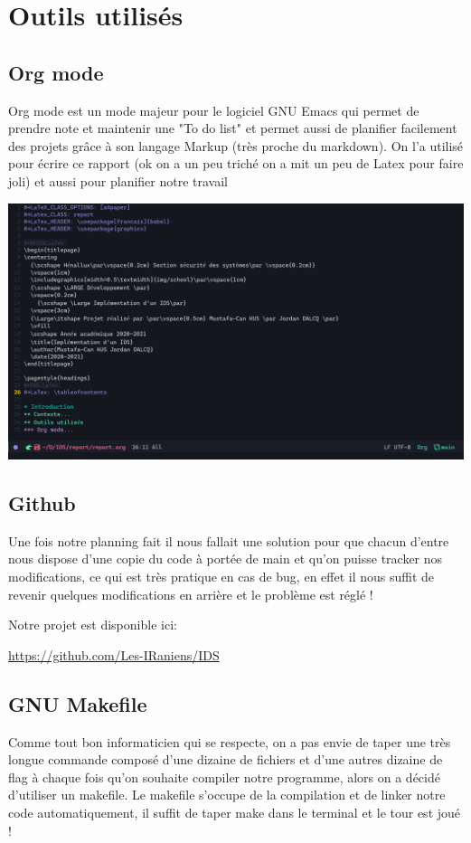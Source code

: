 \documentclass[a4paper]{report}
\begin{document}
\chapter{Outils utilisés}
\label{sec:org9905d3c}
\section{Org mode}
\label{sec:orgf4c7e20}
Org mode est un mode majeur pour le logiciel GNU Emacs qui permet de prendre note et maintenir une "To do list" et permet aussi de planifier facilement des projets
grâce à son langage Markup (très proche du markdown). On l'a utilisé pour écrire ce rapport (ok on a un peu triché on a mit un peu de Latex pour faire joli) et aussi
pour planifier notre travail 

\begin{center}
\includegraphics[width=.9\linewidth]{./img/org.png}
\end{center}
\section{Github}
\label{sec:org895be39}
Une fois notre planning fait il nous fallait une solution pour que chacun d'entre nous dispose d'une copie du code à portée de main  
et qu'on puisse tracker nos modifications, ce qui est très pratique en cas de bug, en effet il nous suffit de revenir 
quelques modifications en arrière et le problème est réglé !

Notre projet est disponible ici:
\begin{LaTex}
\begin{center}
    {\small \url{https://github.com/Les-IRaniens/IDS}}
\end{center}
\end{LaTex}
\section{GNU Makefile}
\label{sec:org6ac154f}
Comme tout bon informaticien qui se respecte, on a pas envie de taper une très longue commande composé d'une dizaine de fichiers et d'une
autres dizaine de flag à chaque fois qu'on souhaite compiler notre programme, alors on a décidé d'utiliser un makefile. 
Le makefile s'occupe de la compilation et de linker notre code automatiquement, il suffit de taper make dans le terminal et le tour est joué !
\end{document}
